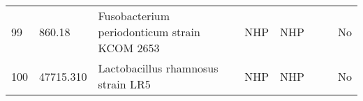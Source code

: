 \begin{tabular}{llllllll}
99  &      860.18 &                      Fusobacterium periodonticum strain KCOM 2653 &           NHP &             NHP &                                 \cite{sphaerophorus2006genus} &                                  &            No \\
100 &   47715.310 &                                Lactobacillus rhamnosus strain LR5 &           NHP &             NHP &                                           \cite{gao2019novel} &                                  &            No \\
\end{tabular}
